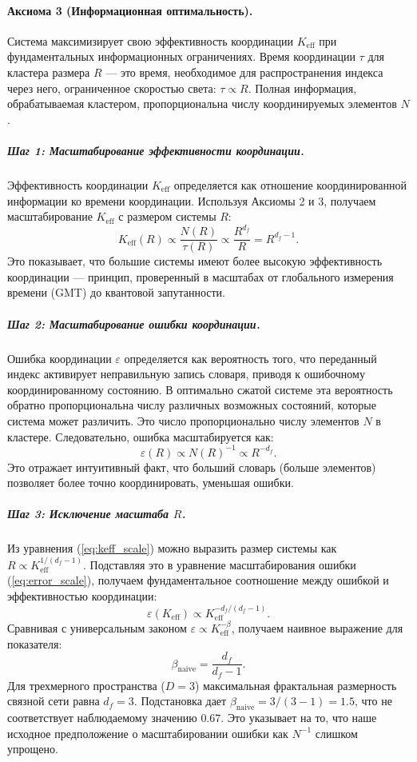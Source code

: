 \documentclass[12pt,a4paper]{article}
\theoremstyle{remark}
\newcommand{\Ke}{K_{\mathrm{eff}}}
\begin{document}
	\paragraph{Аксиома 3 (Информационная оптимальность).}
	Система максимизирует свою эффективность координации \(\Ke\) при фундаментальных информационных ограничениях. Время координации \(\tau\) для кластера размера \(R\) — это время, необходимое для распространения индекса через него, ограниченное скоростью света: \(\tau \propto R\). Полная информация, обрабатываемая кластером, пропорциональна числу координируемых элементов \(N\).
	
	\subparagraph*{Шаг 1: Масштабирование эффективности координации.}
	Эффективность координации \(\Ke\) определяется как отношение координированной информации ко времени координации. Используя Аксиомы 2 и 3, получаем масштабирование \(\Ke\) с размером системы \(R\):
	\begin{equation}
		\Ke(R) \propto \frac{N(R)}{\tau(R)} \propto \frac{R^{d_f}}{R} = R^{d_f - 1}.
		\label{eq:keff_scale}
	\end{equation}
	Это показывает, что большие системы имеют более высокую эффективность координации — принцип, проверенный в масштабах от глобального измерения времени (GMT) до квантовой запутанности.
	
	\subparagraph*{Шаг 2: Масштабирование ошибки координации.}
	Ошибка координации \(\varepsilon\) определяется как вероятность того, что переданный индекс активирует неправильную запись словаря, приводя к ошибочному координированному состоянию. В оптимально сжатой системе эта вероятность обратно пропорциональна числу различных возможных состояний, которые система может различить. Это число пропорционально числу элементов \(N\) в кластере. Следовательно, ошибка масштабируется как:
	\begin{equation}
		\varepsilon(R) \propto N(R)^{-1} \propto R^{-d_f}.
		\label{eq:error_scale}
	\end{equation}
	Это отражает интуитивный факт, что больший словарь (больше элементов) позволяет более точно координировать, уменьшая ошибки.
	
	\subparagraph*{Шаг 3: Исключение масштаба \(R\).}
	Из уравнения (\ref{eq:keff_scale}) можно выразить размер системы как \(R \propto \Ke^{1/(d_f-1)}\). Подставляя это в уравнение масштабирования ошибки (\ref{eq:error_scale}), получаем фундаментальное соотношение между ошибкой и эффективностью координации:
	\begin{equation}
		\varepsilon(\Ke) \propto \Ke^{-d_f/(d_f-1)}.
		\label{eq:error_keff_naive}
	\end{equation}
	Сравнивая с универсальным законом \(\varepsilon \propto \Ke^{-\beta}\), получаем наивное выражение для показателя:
	\begin{equation}
		\beta_{\text{naive}} = \frac{d_f}{d_f-1}.
		\label{eq:beta_naive}
	\end{equation}
	Для трехмерного пространства (\(D = 3\)) максимальная фрактальная размерность связной сети равна \(d_f = 3\). Подстановка дает \(\beta_{\text{naive}} = 3/(3-1) = 1.5\), что не соответствует наблюдаемому значению \(0.67\). Это указывает на то, что наше исходное предположение о масштабировании ошибки как \(N^{-1}\) слишком упрощено.
	
\end{document}
